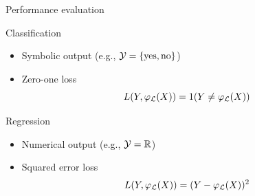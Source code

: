 \documentclass{beamer}
\begin{document}
\begin{frame}{Performance evaluation}

\begin{block}{Classification}
  \begin{itemize}
  \item Symbolic output (e.g., ${\cal Y} = \{ \text{yes}, \text{no} \}$)
  \item Zero-one loss
    $$L(Y, \varphi_{\cal L}(X)) = 1(Y \neq \varphi_{\cal L}(X))$$
  \end{itemize}
\end{block}

\begin{block}{Regression}
  \begin{itemize}
  \item Numerical output (e.g., ${\cal Y} = \mathbb{R}$)
  \item Squared error loss
    $$L(Y, \varphi_{\cal L}(X)) = (Y - \varphi_{\cal L}(X))^2$$
  \end{itemize}

\end{block}

\end{frame}


\end{document}
